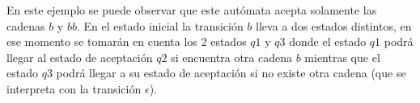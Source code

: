 \hspace*{1cm}En este ejemplo se puede observar que este autómata acepta solamente las cadenas $b$ y $bb$. En el estado inicial la transición $b$ lleva a dos estados distintos, en ese momento se tomarán en cuenta los 2 estados $q1$ y $q3$ donde el estado $q1$ podrá llegar al estado de aceptación $q2$ si encuentra otra cadena $b$ mientras que el estado $q3$ podrá llegar a su estado de aceptación si no existe otra cadena (que se interpreta con la transición $\epsilon$).\\